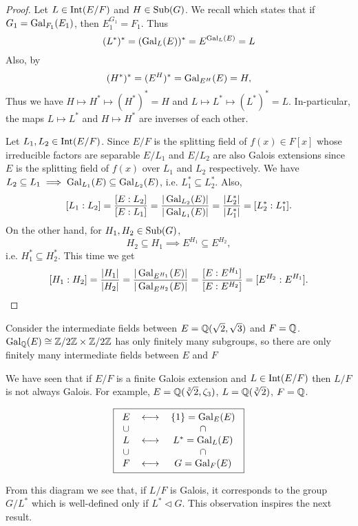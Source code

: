 \documentclass[11pt]{article}
\begin{document}
\begin{proof}
    Let $L\in\operatorname{Int}(E/F)$ and $H\in\operatorname{Sub}(G)$. We recall  which states that if $G_1=\operatorname{Gal}_{F_1}(E_1)$, then $E_1^{G_1}=F_1$. Thus
    \[(L^*)^*=(\operatorname{Gal}_L(E))^*=E^{\operatorname{Gal}_L(E)}=L\]
    Also, by 
    \[(H^*)^*=(E^H)^*=\operatorname{Gal}_{E^H}(E)=H,\]
    Thus we have $H\mapsto H^*\mapsto(H^*)^*=H$ and $L\mapsto L^*\mapsto(L^*)^*=L$. In-particular, the maps $L\mapsto L^*$ and $H\mapsto H^*$ are inverses of each other.

    Let $L_1,L_2\in\operatorname{Int}(E/F)$. Since $E/F$ is the splitting field of $f(x)\in F[x]$ whose irreducible factors are separable $E/L_1$ and $E/L_2$ are also Galois extensions since $E$ is the splitting field of $f(x)$ over $L_1$ and $L_2$ respectively. We have $L_2\subseteq L_1\implies\operatorname{Gal}_{L_1}(E)\subseteq\operatorname{Gal}_{L_2}(E)$, i.e. $L_1^*\subseteq L_2^*$. Also, 
    \[[L_1:L_2]=\frac{[E:L_2]}{[E:L_1]}=\frac{|\operatorname{Gal}_{L_2}(E)|}{|\operatorname{Gal}_{L_1}(E)|}=\frac{|L_2^*|}{|L_1^*|}=[L_2^*:L_1^*].\]
    On the other hand, for $H_1,H_2\in\operatorname{Sub}(G)$,
    \[H_2\subseteq H_1\implies E^{H_1}\subseteq E^{H_2},\]
    i.e. $H_1^*\subseteq H_2^*$. This time we get
    \[[H_1:H_2]=\frac{|H_1|}{|H_2|}=\frac{|\operatorname{Gal}_{E^{H_1}}(E)|}{|\operatorname{Gal}_{E^{H_2}}(E)|}=\frac{[E:E^{H_1}]}{[E:E^{H_2}]}=[E^{H_2}:E^{H_1}].\]
\end{proof}

\begin{remark}
    Consider the intermediate fields between $E=\mathbb{Q}(\sqrt{2},\sqrt{3})$ and $F=\mathbb{Q}$. $\operatorname{Gal}_{\mathbb{Q}}(E)\cong\mathbb{Z}/2\mathbb{Z}\times\mathbb{Z}/2\mathbb{Z}$ has only finitely many subgroups, so there are only finitely many intermediate fields between $E$ and $F$
\end{remark}

We have seen that if $E/F$ is a finite Galois extension and $L\in\operatorname{Int}(E/F)$ then $L/F$ is not always Galois. For example, $E=\mathbb{Q}(\sqrt[3]{2},\zeta_3)$, $L=\mathbb{Q}(\sqrt[3]{2})$, $F=\mathbb{Q}$.

\[\fbox{\begin{tabular}{ccc}
    $E$ & $\longleftrightarrow$ & $\{1\}=\Gal_E(E)$ \\
    $\cup$ & & $\cap$ \\
    $L$ & $\longleftrightarrow$ & $L^*=\Gal_L(E)$ \\
    $\cup$ & & $\cap$ \\
    $F$ & $\longleftrightarrow$ & $G=\Gal_F(E)$
\end{tabular}}\]

From this diagram we see that, if $L/F$ is Galois, it corresponds to the group $G/L^*$ which is well-defined only if $L^*\lhd G$. This observation inspires the next result.
\end{document}
